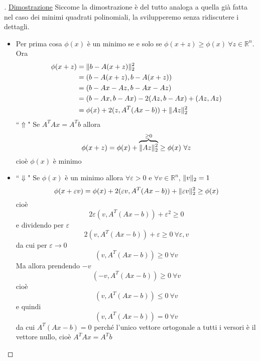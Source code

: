 \documentclass[12pt,a4paper]{article}
\DeclarePairedDelimiter{\norma}{\lVert}{\rVert}
\begin{document}
\begin{proof}[\unskip\nopunct]
\uline{Dimostrazione} Siccome la dimostrazione è del tutto analoga a quella già fatta nel caso dei minimi quadrati polinomiali, la svilupperemo senza ridiscutere i dettagli. 
\begin{itemize}
\item Per prima cosa $\phi(x)$ è un minimo se e solo se $\phi(x+z)\geq \phi(x) \ \forall z \in \mathbb{R}^n$. \\
Ora
\begin{equation*}
    \begin{split}
        \phi(x+z) & = \norma{b-A(x+z)}_2^2 \\
        & = (b-A(x+z), b-A(x+z)) \\
        & = (b-Ax-Az, b-Ax-Az) \\
        & = (b-Ax, b-Ax)-2(Az,b-Ax) + (Az, Az) \\
        & = \phi(x) + 2(z,A^T(Ax-b))+\norma{Az}_2^2
    \end{split}
\end{equation*}
``$\Uparrow$" Se $A^TAx=A^Tb$ allora 
\begin{equation*}
    \phi(x+z) = \phi(x) + \overbrace{\norma{Az}_2^2}^{\geq 0} \geq \phi(x) \ \forall z
\end{equation*}
cioè $\phi(x)$ è minimo

\item ``$\Downarrow$" Se $\phi(x)$ è un minimo allora $\forall \varepsilon >0$ e $\forall v \in \mathbb{R}^n$, $\norma{v}_2=1$
\begin{equation*}
    \phi(x+\varepsilon v)=\phi(x) + 2(\varepsilon v, A^T(Ax-b)) + \norma{\varepsilon v}_2^2 \geq \phi(x)
\end{equation*}
cioè
\begin{equation*}
    2\varepsilon(v,A^T(Ax-b))+\varepsilon^2 \geq 0
\end{equation*}
e dividendo per $\varepsilon$
\begin{equation*}
    2(v,A^T(Ax-b))+\varepsilon \geq 0 \ \forall \varepsilon,v
\end{equation*}
da cui per $\varepsilon \to 0$
\begin{equation*}
    (v, A^T(Ax-b)) \geq 0 \ \forall v
\end{equation*}
Ma allora prendendo $-v$
\begin{equation*}
    (-v, A^T(Ax-b)) \geq 0 \ \forall v
\end{equation*}
cioè
\begin{equation*}
    (v, A^T(Ax-b)) \leq 0 \ \forall v
\end{equation*}
e quindi
\begin{equation*}
    (v, A^T(Ax-b)) = 0 \ \forall v
\end{equation*}
da cui $A^T(Ax-b)=0$ perché l'unico vettore ortogonale a tutti i versori è il vettore nullo, cioè $A^TAx=A^Tb$
\end{itemize}
\end{proof}
\end{document}
